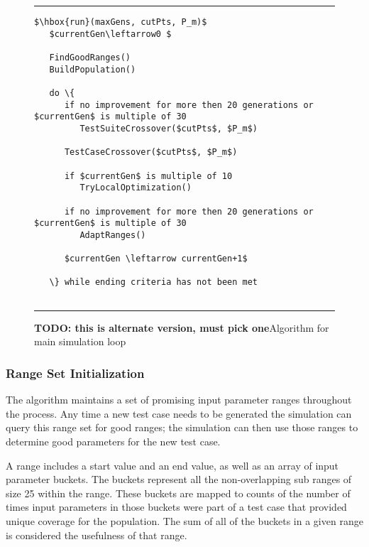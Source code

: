 \documentclass[runningheads]{llncs}
\begin{document}
\begin{figure}[h!]
\begin{center}
\hrule
\medskip
\begin{Verbatim}[fontfamily=tt, xleftmargin=10pt, commandchars=\\\{\},
        codes={\catcode`$=3\catcode`^=7\catcode`_=8}]
$\hbox{run}(maxGens, cutPts, P_m)$
   $currentGen\leftarrow0 $
   
   FindGoodRanges()
   BuildPopulation()
   
   do \{
      if no improvement for more then 20 generations or $currentGen$ is multiple of 30
         TestSuiteCrossover($cutPts$, $P_m$) 

      TestCaseCrossover($cutPts$, $P_m$)
      
      if $currentGen$ is multiple of 10
         TryLocalOptimization()
         
      if no improvement for more then 20 generations or $currentGen$ is multiple of 30
         AdaptRanges() 
         
      $currentGen \leftarrow currentGen+1$

   \} while ending criteria has not been met
   
\end{Verbatim}
\hrule
\end{center}
\caption{\textbf{TODO: this is alternate version, must pick one}Algorithm for main simulation loop \label{fig:simLoopAlt}}
\end{figure}

\FloatBarrier
\subsubsection{Range Set Initialization}
The algorithm maintains a set of promising input parameter ranges throughout the process. Any time a new test case needs to be generated the simulation can query this range set for good ranges; the simulation can then use those ranges to determine good parameters for the new test case.

A range includes a start value and an end value, as well as an array of input parameter buckets. The buckets represent all the non-overlapping sub ranges of size 25 within the range. These buckets are mapped to counts of the number of times input parameters in those buckets were part of a test case that provided unique coverage for the population. The sum of all of the buckets in a given range is considered the usefulness of that range.  
\end{document}
